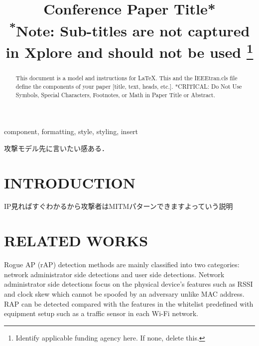 \documentclass[conference]{IEEEtran}
\begin{document}
\title{Conference Paper Title*\\
{\footnotesize \textsuperscript{*}Note: Sub-titles are not captured in Xplore and
should not be used}
\thanks{Identify applicable funding agency here. If none, delete this.}
}

\author{
\and
{}
\and
{}
\and

}

\maketitle

\begin{abstract}
This document is a model and instructions for \LaTeX.
This and the IEEEtran.cls file define the components of your paper [title, text, heads, etc.]. *CRITICAL: Do Not Use Symbols, Special Characters, Footnotes, 
or Math in Paper Title or Abstract.
\end{abstract}

\begin{IEEEkeywords}
component, formatting, style, styling, insert
\end{IEEEkeywords}
 攻撃モデル先に言いたい感ある．
\section{INTRODUCTION}
IP見ればすぐわかるから攻撃者はMITMパターンできますよっていう説明
\section{RELATED WORKS}
Rogue AP (rAP) detection methods are mainly classified into two categories: network administrator side detections and user side detections.
Network administrator side detections focus on the physical device's features such as RSSI and clock skew which cannot be spoofed by an adversary unlike MAC address.
RAP can be detected compared with the features in the whitelist predefined with equipment setup such as a traffic sensor in each Wi-Fi network.
\end{document}
